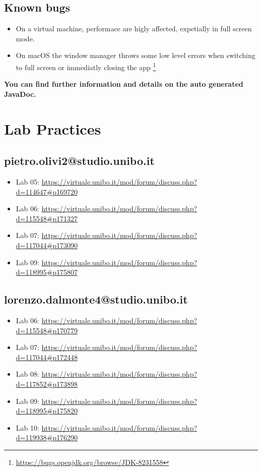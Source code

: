 \documentclass[a4paper,12pt]{report}
\begin{document}
\section*{Known bugs}
\begin{itemize}
	\item On a virtual machine, performace are higly affected, expetially in full screen mode.
	\item On macOS the window manager throws some low level errors when switching to full screen or immediatly closing the app \footnote{\url{https://bugs.openjdk.org/browse/JDK-8231558}} 
\end{itemize}
\textbf{You can find further information and details on the auto generated JavaDoc.}
\chapter{Lab Practices}
\section*{pietro.olivi2@studio.unibo.it}
\begin{itemize}
	\item Lab 05: \url{https://virtuale.unibo.it/mod/forum/discuss.php?d=114647#p169720}
	\item Lab 06: \url{https://virtuale.unibo.it/mod/forum/discuss.php?d=115548#p171327}
	\item Lab 07: \url{https://virtuale.unibo.it/mod/forum/discuss.php?d=117044#p173090}
	\item Lab 09: \url{https://virtuale.unibo.it/mod/forum/discuss.php?d=118995#p175807}
\end{itemize}

\section*{lorenzo.dalmonte4@studio.unibo.it}

\begin{itemize}
	\item Lab 06: \url{https://virtuale.unibo.it/mod/forum/discuss.php?d=115548#p170779}
	\item Lab 07: \url{https://virtuale.unibo.it/mod/forum/discuss.php?d=117044#p172448}
	\item Lab 08: \url{https://virtuale.unibo.it/mod/forum/discuss.php?d=117852#p173898}
	\item Lab 09: \url{https://virtuale.unibo.it/mod/forum/discuss.php?d=118995#p175820}
	\item Lab 10: \url{https://virtuale.unibo.it/mod/forum/discuss.php?d=119938#p176290}
\end{itemize}
\end{document}
